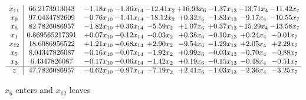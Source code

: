 \documentclass[8pt]{article}
\begin{document}
 \[\begin{array}{c| c c@{\hskip 2pt} c@{\hskip 2pt} c@{\hskip 2pt} c@{\hskip 2pt} c@{\hskip 2pt} c@{\hskip 2pt} c@{\hskip 2pt} }
 x_{11}   &  66.2173913043 & -1.18 x_{10} & -1.36 x_{14} & -12.41 x_{2} & + 16.93 x_{6} & -1.37 x_{13} & -13.71 x_{4} & -11.42 x_{7}\\
 x_{9}   &  97.0434782609 & -0.76 x_{10} & -1.41 x_{14} & -18.12 x_{2} & +  0.32 x_{6} & -1.83 x_{13} & -9.17 x_{4} & -10.55 x_{7}\\
 x_{8}   &  82.7826086957 & -1.82 x_{10} & +  0.36 x_{14} & -5.59 x_{2} & +  1.07 x_{6} & +  0.37 x_{13} & -15.29 x_{4} & -13.58 x_{7}\\
 x_{1}   &  0.869565217391 & +  0.07 x_{10} & -0.12 x_{14} & -0.03 x_{2} & +  0.38 x_{6} & -0.10 x_{13} & +  0.24 x_{4} & -0.01 x_{7}\\
 x_{12}   &  18.6086956522 & +  1.21 x_{10} & -0.68 x_{14} & +  2.90 x_{2} & -9.54 x_{6} & -1.29 x_{13} & +  2.05 x_{4} & +  2.29 x_{7}\\
 x_{5}   &  8.04347826087 & -0.16 x_{10} & -0.07 x_{14} & -1.92 x_{2} & +  0.99 x_{6} & -0.03 x_{13} & -0.70 x_{4} & -0.88 x_{7}\\
 x_{3}   &  6.4347826087 & -0.17 x_{10} & -0.06 x_{14} & -1.42 x_{2} & +  0.19 x_{6} & -0.15 x_{13} & -0.48 x_{4} & -0.51 x_{7}\\
\hline
z    &  47.7826086957 & -0.62 x_{10} & -0.97 x_{14} & -7.19 x_{2} & +  2.41 x_{6} & -1.03 x_{13} & -2.36 x_{4} & -3.25 x_{7}\\
\end{array}\]


 $ x_{6} $ enters and $ x_{12} $ leaves 
\end{document}
